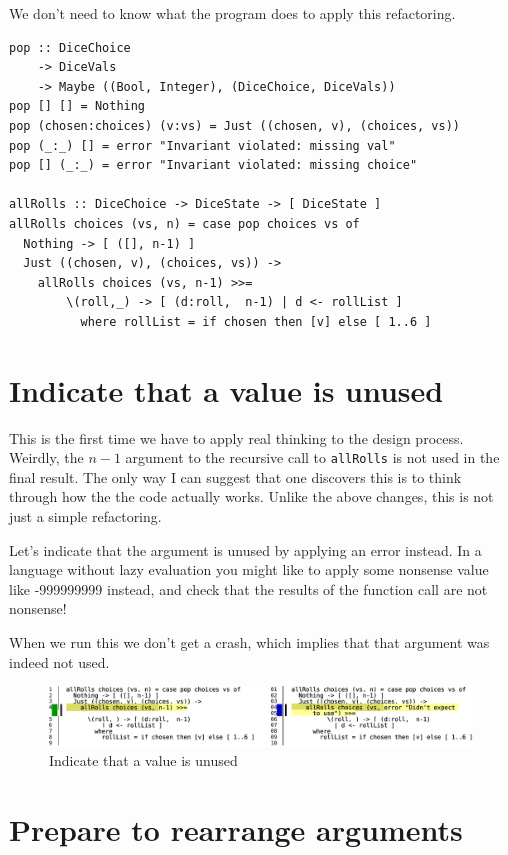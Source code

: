 We don't need to know what the program does to apply this refactoring.

\begin{verbatim}
pop :: DiceChoice
    -> DiceVals
    -> Maybe ((Bool, Integer), (DiceChoice, DiceVals))
pop [] [] = Nothing
pop (chosen:choices) (v:vs) = Just ((chosen, v), (choices, vs))
pop (_:_) [] = error "Invariant violated: missing val"
pop [] (_:_) = error "Invariant violated: missing choice"

allRolls :: DiceChoice -> DiceState -> [ DiceState ]
allRolls choices (vs, n) = case pop choices vs of
  Nothing -> [ ([], n-1) ]
  Just ((chosen, v), (choices, vs)) ->
    allRolls choices (vs, n-1) >>=
        \(roll,_) -> [ (d:roll,  n-1) | d <- rollList ]
          where rollList = if chosen then [v] else [ 1..6 ]
\end{verbatim}


\section{Indicate that a value is unused}


This is the first time we have to apply real thinking to the design process. Weirdly, the $n-1$ argument to the recursive call to \texttt{allRolls} is not used in the final result. The only way I can suggest that one discovers this is to think through how the the code actually works. Unlike the above changes, this is not just a simple refactoring.

Let's indicate that the argument is unused by applying an error instead. In a language without lazy evaluation you might like to apply some nonsense value like -999999999 instead, and check that the results of the function call are not nonsense!

When we run this we don't get a crash, which implies that that argument was indeed not used.

\begin{figure}[htbp]
 \centering
 \includegraphics[width=\linewidth]{./pics/diff4.pdf}
 \caption{Indicate that a value is unused}
 \label{fig:diff4}
\end{figure}
           
\section{Prepare to rearrange arguments}


